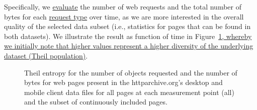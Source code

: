 \documentclass[onecolumn,12pt]{IEEEtran}
\begin{document}
Specifically, we \uline{evaluate} the number of web requests and the total number of bytes for each \uline{request type} over time, as we are more interested in the overall quality of the selected data subset (i.e., statistics for pages that can be found in both datasets).
We illustrate the result as function of time in Figure~\ref{fig:theil}\uline{, whereby we initially note that higher values represent a higher diversity of the underlying dataset (Theil population)}.
\begin{figure}
	\centering
	\qquad
	\caption{Theil entropy for the number of objects requested and the number of bytes for web pages present in the httparchive.org's desktop and mobile client data files for all pages at each measurement point (all) and the subset of continuously included pages.}
	\label{fig:theil}
\end{figure}
\end{document}
